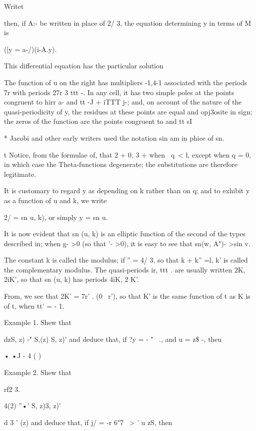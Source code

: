 Writet %

then, if A:- be written in place of 2/ 3, the equation determining y
in terms of M is

(|y = a-/)(i-A.y).

This differential equation has the particular solution

The function of u on the right has multipliers -1,4-1 associated with
the periods 7r%
with periods 27r 3 ttt -. In any cell, it has two simple poles at the
points congruent to hirr a- and tt -J + iTTT j-; and, on account of
the nature of the quasi-periodicity of y, the residues at these points
are equal and opj3osite in sign; the zeros of the function are the
points congruent to and tt sI

* Jacobi and other early writers used the notation sin am in phice of
sn.

t Notice, from the formulae of, that 2 + 0, 3 + when \ q\ < l,
except when q = 0, in which case the Theta-functions degenerate; the
substitutions are therefore legitimate.

%
%

It is customary to regard y as depending on k rather than on q; and
to exhibit y as a function of u and k, we write

2/ = sn u, k), or simply y = sn u.

It is now evident that sn (u, k) is an elliptic function of the second
of the types described in; when g- >0 (so that '- >0), it is
easy to see that sn(w, A")- >sin v.

The constant k is called the modulus; if '' = 4/ 3, so that k + k''
=l, k' is called the complementary modulus. The quasi-periods ir, ttt
. are usually written 2K, 2iK', so that sn (u, k) has periods 4iK, 2
K'.

From, we see that 2K' = 7r' . (0 \ r'), so that K' is the same
function of t as K is of t, when tt' = - 1.

Example 1. Shew that

dzS, z) -" S,(z) S, z)' and deduce that, if ?y = - " ~., and u = z\$
-, theu

• •J - 4 ( )

Example 2. Shew that

rf2 3.

4(2) ''•' S, z)3, z)'

d 3 ' (z) and deduce that, if j/ = -r 6"7 \ > ' u zS, then

